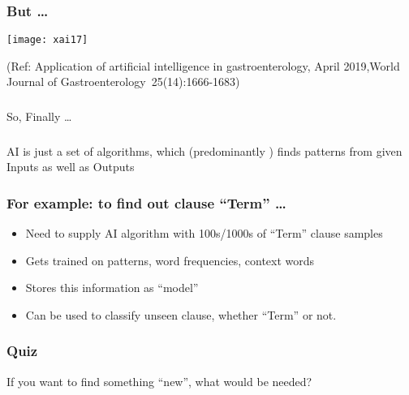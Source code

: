\begin{frame}[fragile]\frametitle{But \ldots}
\begin{center}
\texttt{[image: xai17]}
\end{center}

\tiny{(Ref: Application of artificial intelligence in gastroenterology, April 2019,World Journal of Gastroenterology 25(14):1666-1683)
}
\end{frame}

\begin{frame}[fragile]\frametitle{}
\begin{center}
{\Large So, Finally \ldots}
\end{center}
\end{frame}

\begin{frame}[fragile]\frametitle{}


\begin{center}
AI is just a set of algorithms, 
which (predominantly ) finds patterns from given Inputs as well as Outputs
\end{center}


\end{frame}

\begin{frame}[fragile]\frametitle{For example: to find out clause ``Term'' \ldots}
\begin{itemize}
\item Need to supply AI algorithm with 100s/1000s of ``Term'' clause samples
\item Gets trained on patterns, word frequencies, context words
\item Stores this information as ``model''
\item Can be used to classify unseen clause, whether ``Term'' or not.
\end{itemize}
\end{frame}

\begin{frame}[fragile]\frametitle{Quiz}
If you want to find something ``new'', what would be needed?
\end{frame}

